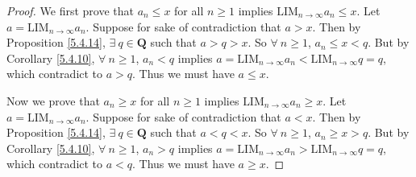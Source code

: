 \begin{proof}
We first prove that \(a_n \leq x\) for all \(n \geq 1\) implies \(\text{LIM}_{n \to \infty} a_n \leq x\).
Let \(a = \text{LIM}_{n \to \infty} a_n\).
Suppose for sake of contradiction that \(a > x\).
Then by Proposition \ref{5.4.14}, \(\exists\ q \in \mathbf{Q}\) such that \(a > q > x\).
So \(\forall\ n \geq 1\), \(a_n \leq x < q\).
But by Corollary \ref{5.4.10}, \(\forall\ n \geq 1\), \(a_n < q\) implies \(a = \text{LIM}_{n \to \infty} a_n < \text{LIM}_{n \to \infty} q = q\), which contradict to \(a > q\).
Thus we must have \(a \leq x\).

Now we prove that \(a_n \geq x\) for all \(n \geq 1\) implies \(\text{LIM}_{n \to \infty} a_n \geq x\).
Let \(a = \text{LIM}_{n \to \infty} a_n\).
Suppose for sake of contradiction that \(a < x\).
Then by Proposition \ref{5.4.14}, \(\exists\ q \in \mathbf{Q}\) such that \(a < q < x\).
So \(\forall\ n \geq 1\), \(a_n \geq x > q\).
But by Corollary \ref{5.4.10}, \(\forall\ n \geq 1\), \(a_n > q\) implies \(a = \text{LIM}_{n \to \infty} a_n > \text{LIM}_{n \to \infty} q = q\), which contradict to \(a < q\).
Thus we must have \(a \geq x\).
\end{proof}